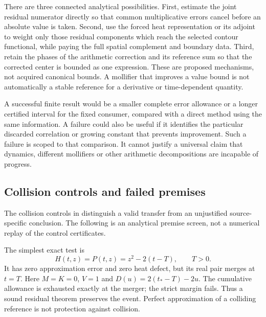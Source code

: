 There are three connected analytical possibilities. First, estimate the
joint residual numerator directly so that common multiplicative errors
cancel before an absolute value is taken. Second, use the forced heat
representation or its adjoint to weight only those residual components
which reach the selected contour functional, while paying the full
spatial complement and boundary data. Third, retain the phases of the
arithmetic correction and its reference sum so that the corrected center
is bounded as one expression. These are proposed mechanisms, not acquired
canonical bounds. A mollifier that improves a value bound is not
automatically a stable reference for a derivative or time-dependent
quantity.

A successful finite result would be a smaller complete error allowance
or a longer certified interval for the fixed consumer, compared with
a direct method using the same information. A failure could also be
useful if it identifies the particular discarded correlation or growing
constant that prevents improvement. Such a failure is scoped to that
comparison. It cannot justify a universal claim that dynamics, different
mollifiers or other arithmetic decompositions are incapable of progress.

\subsection{Collision controls and failed premises}

The collision controls in \cite{RepositoryControls} distinguish a valid
transfer from an unjustified source-specific conclusion. The following
is an analytical premise screen, not a numerical replay of the control
certificates.

The simplest exact test is
\begin{equation}
 H(t,z)=P(t,z)=z^2-2(t-T),\qquad T>0.
 \label{prog:quadratic}
\end{equation}
It has zero approximation error and zero heat defect, but its real pair
merges at $t=T$. Here $M=K=0$, $V=1$ and
$D(u)=2(t_*-T)-2u$. The cumulative allowance is exhausted exactly at the
merger; the strict margin fails. Thus a sound residual theorem preserves
the event. Perfect approximation of a colliding reference is not
protection against collision.

